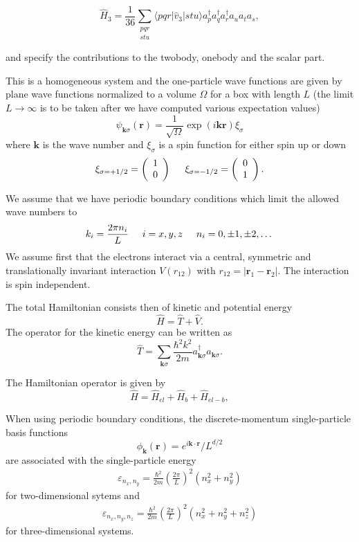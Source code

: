 \[
\hat{H}_3 = \frac{1}{36} \sum_{\substack{pqr \\ stu}}
                 \langle pqr|\hat{v}_3|stu\rangle a^\dagger_p a^\dagger_q a^\dagger_r a_u a_t a_s,
\]

and specify the contributions to the twobody, onebody and the scalar part.





This is a homogeneous system and the one-particle wave functions are given by plane wave functions normalized to a volume $\Omega$ 
for a box with length $L$ (the limit $L\rightarrow \infty$ is to be taken after we have computed various expectation values)
\[
\psi_{\mathbf{k}\sigma}(\mathbf{r})= \frac{1}{\sqrt{\Omega}}\exp{(i\mathbf{kr})}\xi_{\sigma}
\]
where $\mathbf{k}$ is the wave number and  $\xi_{\sigma}$ is a spin function for either spin up or down
\[ 
\xi_{\sigma=+1/2}=\left(\begin{array}{c} 1 \\ 0 \end{array}\right) \hspace{0.5cm}
\xi_{\sigma=-1/2}=\left(\begin{array}{c} 0 \\ 1 \end{array}\right).
\]



We assume that we have periodic boundary conditions which limit the allowed wave numbers to
\[
k_i=\frac{2\pi n_i}{L}\hspace{0.5cm} i=x,y,z \hspace{0.5cm} n_i=0,\pm 1,\pm 2, \dots
\]
We assume first that the electrons interact via a central, symmetric and translationally invariant
interaction  $V(r_{12})$ with
$r_{12}=|\mathbf{r}_1-\mathbf{r}_2|$.  The interaction is spin independent.

The total Hamiltonian consists then of kinetic and potential energy
\[
\hat{H} = \hat{T}+\hat{V}.
\]
The operator for the kinetic energy can be written as
\[
\hat{T}=\sum_{\mathbf{k}\sigma}\frac{\hbar^2k^2}{2m}a_{\mathbf{k}\sigma}^{\dagger}a_{\mathbf{k}\sigma}.
\]


The Hamiltonian operator is given by
\[
\hat{H}=\hat{H}_{el}+\hat{H}_{b}+\hat{H}_{el-b},
\]


When using periodic boundary conditions, the 
discrete-momentum single-particle basis functions 
\[
\phi_{\mathbf{k}}(\mathbf{r}) =
e^{i\mathbf{k}\cdot \mathbf{r}}/L^{d/2}
\]
are associated with 
the single-particle energy   
\begin{align}
  \varepsilon_{n_{x}, n_{y}} = \frac{\hbar^{2}}{2m} \left( \frac{2\pi }{L}\right)^{2}\left( n_{x}^{2} + n_{y}^{2}\right)
\end{align}
for two-dimensional sytems and 
\begin{align}
  \varepsilon_{n_{x}, n_{y}, n_{z}} = \frac{\hbar^{2}}{2m}
  \left( \frac{2\pi }{L}\right)^{2}
  \left( n_{x}^{2} + n_{y}^{2} + n_{z}^{2}\right)
\end{align} 
for three-dimensional systems.


